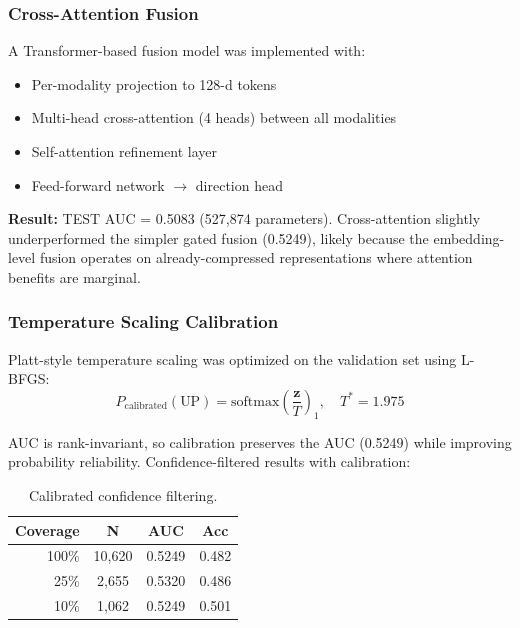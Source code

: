 \documentclass[12pt,a4paper]{article}
\begin{document}
\subsubsection{Cross-Attention Fusion}

A Transformer-based fusion model was implemented with:
\begin{itemize}[noitemsep]
    \item Per-modality projection to 128-d tokens
    \item Multi-head cross-attention (4 heads) between all modalities
    \item Self-attention refinement layer
    \item Feed-forward network $\rightarrow$ direction head
\end{itemize}

\textbf{Result:} TEST AUC = 0.5083 (527,874 parameters). Cross-attention slightly underperformed the simpler gated fusion (0.5249), likely because the embedding-level fusion operates on already-compressed representations where attention benefits are marginal.

\subsubsection{Temperature Scaling Calibration}

Platt-style temperature scaling was optimized on the validation set using L-BFGS:
\begin{equation}
P_{\text{calibrated}}(\text{UP}) = \text{softmax}\left(\frac{\mathbf{z}}{T}\right)_1, \quad T^* = 1.975
\end{equation}

AUC is rank-invariant, so calibration preserves the AUC (0.5249) while improving probability reliability. Confidence-filtered results with calibration:

\begin{table}[H]
\centering
\caption{Calibrated confidence filtering.}
\begin{tabular}{rccc}
\toprule
\textbf{Coverage} & \textbf{N} & \textbf{AUC} & \textbf{Acc} \\
\midrule
100\% & 10,620 & 0.5249 & 0.482 \\
25\%  & 2,655  & 0.5320 & 0.486 \\
10\%  & 1,062  & 0.5249 & 0.501 \\
\bottomrule
\end{tabular}
\end{table}
\end{document}
